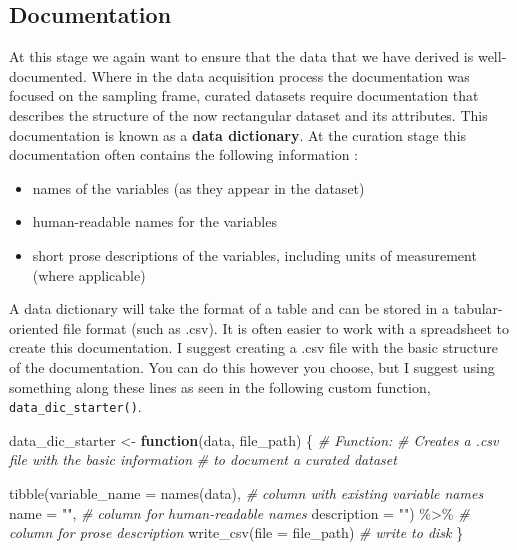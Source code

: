 \documentclass[
]{article}
\newenvironment{Shaded}{\begin{snugshade}}{\end{snugshade}}
\newcommand{\AttributeTok}[1]{\textcolor[rgb]{0.77,0.63,0.00}{#1}}
\newcommand{\CommentTok}[1]{\textcolor[rgb]{0.56,0.35,0.01}{\textit{#1}}}
\newcommand{\ControlFlowTok}[1]{\textcolor[rgb]{0.13,0.29,0.53}{\textbf{#1}}}
\newcommand{\FunctionTok}[1]{\textcolor[rgb]{0.00,0.00,0.00}{#1}}
\newcommand{\NormalTok}[1]{#1}
\newcommand{\OtherTok}[1]{\textcolor[rgb]{0.56,0.35,0.01}{#1}}
\newcommand{\SpecialCharTok}[1]{\textcolor[rgb]{0.00,0.00,0.00}{#1}}
\newcommand{\StringTok}[1]{\textcolor[rgb]{0.31,0.60,0.02}{#1}}
\providecommand{\tightlist}{%
  \setlength{\itemsep}{0pt}\setlength{\parskip}{0pt}}
\begin{document}
\hypertarget{documentation-2}{%
\subsection{Documentation}\label{documentation-2}}

At this stage we again want to ensure that the data that we have derived is well-documented. Where in the data acquisition process the documentation was focused on the sampling frame, curated datasets require documentation that describes the structure of the now rectangular dataset and its attributes. This documentation is known as a \textbf{data dictionary}. At the curation stage this documentation often contains the following information \citep{HowMakeData10-2021}:

\begin{itemize}
\tightlist
\item
  names of the variables (as they appear in the dataset)
\item
  human-readable names for the variables
\item
  short prose descriptions of the variables, including units of measurement (where applicable)
\end{itemize}

A data dictionary will take the format of a table and can be stored in a tabular-oriented file format (such as .csv). It is often easier to work with a spreadsheet to create this documentation. I suggest creating a .csv file with the basic structure of the documentation. You can do this however you choose, but I suggest using something along these lines as seen in the following custom function, \texttt{data\_dic\_starter()}.

\begin{Shaded}
\begin{Highlighting}[]
\NormalTok{data\_dic\_starter }\OtherTok{\textless{}{-}} \ControlFlowTok{function}\NormalTok{(data, file\_path) \{}
  \CommentTok{\# Function:}
  \CommentTok{\# Creates a .csv file with the basic information}
  \CommentTok{\# to document a curated dataset}
  
  \FunctionTok{tibble}\NormalTok{(}\AttributeTok{variable\_name =} \FunctionTok{names}\NormalTok{(data), }\CommentTok{\# column with existing variable names }
       \AttributeTok{name =} \StringTok{""}\NormalTok{, }\CommentTok{\# column for human{-}readable names}
       \AttributeTok{description =} \StringTok{""}\NormalTok{) }\SpecialCharTok{\%\textgreater{}\%} \CommentTok{\# column for prose description}
  \FunctionTok{write\_csv}\NormalTok{(}\AttributeTok{file =}\NormalTok{ file\_path) }\CommentTok{\# write to disk}
\NormalTok{\}}
\end{Highlighting}
\end{Shaded}
\end{document}
